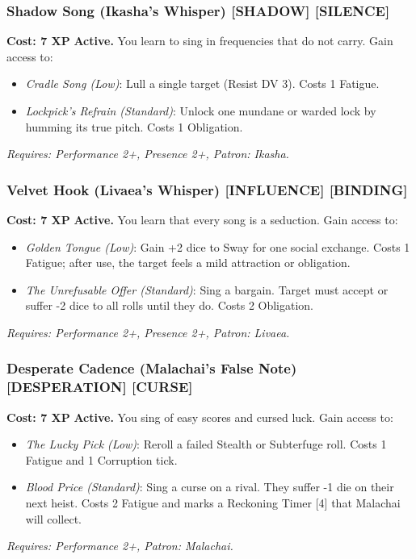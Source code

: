 \documentclass[12pt,a4paper]{book}
\begin{document}
\subsubsection*{Shadow Song (Ikasha's Whisper) \textnormal{[SHADOW] [SILENCE]}}
\label{talent:shadow-song}
\textbf{Cost: 7 XP} \textbf{Active.} You learn to sing in frequencies that do not carry. Gain access to:
\begin{itemize}
\item \textit{Cradle Song (Low)}: Lull a single target (Resist DV 3). Costs 1 Fatigue.
\item \textit{Lockpick's Refrain (Standard)}: Unlock one mundane or warded lock by humming its true pitch. Costs 1 Obligation.
\end{itemize}
\textit{Requires: Performance 2+, Presence 2+, Patron: Ikasha.}

\subsubsection*{Velvet Hook (Livaea's Whisper) \textnormal{[INFLUENCE] [BINDING]}}
\label{talent:velvet-hook}
\textbf{Cost: 7 XP} \textbf{Active.} You learn that every song is a seduction. Gain access to:
\begin{itemize}
\item \textit{Golden Tongue (Low)}: Gain +2 dice to Sway for one social exchange. Costs 1 Fatigue; after use, the target feels a mild attraction or obligation.
\item \textit{The Unrefusable Offer (Standard)}: Sing a bargain. Target must accept or suffer -2 dice to all rolls until they do. Costs 2 Obligation.
\end{itemize}
\textit{Requires: Performance 2+, Presence 2+, Patron: Livaea.}

\subsubsection*{Desperate Cadence (Malachai's False Note) \textnormal{[DESPERATION] [CURSE]}}
\label{talent:desperate-cadence}
\textbf{Cost: 7 XP} \textbf{Active.} You sing of easy scores and cursed luck. Gain access to:
\begin{itemize}
\item \textit{The Lucky Pick (Low)}: Reroll a failed Stealth or Subterfuge roll. Costs 1 Fatigue and 1 Corruption tick.
\item \textit{Blood Price (Standard)}: Sing a curse on a rival. They suffer -1 die on their next heist. Costs 2 Fatigue and marks a Reckoning Timer [4] that Malachai will collect.
\end{itemize}
\textit{Requires: Performance 2+, Patron: Malachai.}
\end{document}
